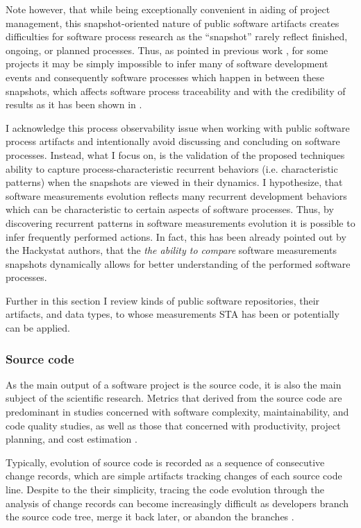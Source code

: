 Note however, that while being exceptionally convenient in aiding of project management, this snapshot-oriented nature 
of public software artifacts creates difficulties for software process research as the ``snapshot'' rarely reflect finished, 
ongoing, or planned processes. 
Thus, as pointed in previous work \cite{citeulike:1296888}, for some projects it may be simply impossible to infer 
many of software development events and consequently software processes which happen in between these snapshots,
which affects software process traceability and with the credibility of results as it has been shown in 
\cite{citeulike:2280690} \cite{citeulike:9037939}. 

I acknowledge this process observability issue when working with public software process artifacts and intentionally avoid 
discussing and concluding on software processes. Instead, what I focus on, is the validation of the proposed techniques 
ability to capture process-characteristic recurrent behaviors (i.e. characteristic patterns) when the snapshots are 
viewed in their dynamics. 
I hypothesize, that software measurements evolution reflects many recurrent development behaviors which can be 
characteristic to certain aspects of software processes. Thus, by discovering recurrent patterns in software measurements
evolution it is possible to infer frequently performed actions. In fact, this has been already pointed out by the Hackystat authors, 
\cite{citeulike:557296} that the \textit{the ability to compare} software measurements snapshots dynamically allows for 
better understanding of the performed software processes.

Further in this section I review kinds of public software repositories, their artifacts, and data types, to whose 
measurements STA has been or potentially can be applied. 


\subsubsection{Source code}
As the main output of a software project is the source code, it is also the main subject of the scientific research. 
Metrics that derived from the source code are predominant in studies concerned with software complexity, maintainability,
and code quality studies, as well as those that concerned with productivity, project planning, 
and cost estimation \cite{citeulike:4534888}. 

Typically, evolution of source code is recorded as a sequence of consecutive change records, which are simple artifacts 
tracking changes of each source code line. Despite to the their simplicity, tracing the code evolution through the analysis 
of change records can become increasingly difficult as developers branch the source code tree, merge it back later, 
or abandon the branches \cite{citeulike:13156191}.

